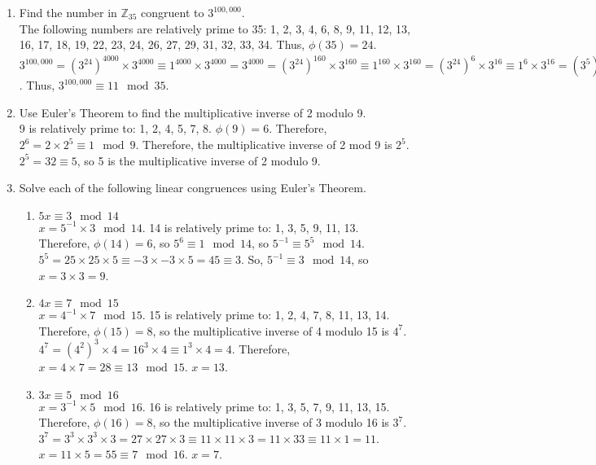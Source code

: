 \documentclass{article}
\begin{document}
\begin{enumerate}
    \item Find the number in $\mathbb{Z}_{35}$ congruent to $3^{100,000}$.\\
    The following numbers are relatively prime to 35: 1, 2, 3, 4, 6, 8, 9, 11, 12, 13, 16, 17, 18, 19, 22, 23, 24, 26, 27, 29, 31, 32, 33, 34. Thus, $\phi(35) = 24$. $3^{100,000} = (3^{24})^{4000} \times 3^{4000} \equiv 1^{4000} \times 3^{4000} = 3^{4000} = (3^{24})^{160} \times 3^{160} \equiv 1^{160} \times 3^{160} = (3^{24})^{6} \times 3^{16} \equiv 1^{6} \times 3^{16} = (3^{5})^{3} \times 3 = 243^{3} \times 3 \equiv (-2)^{3} \times 3 = -24 \equiv 11 \mod 35$. Thus, $3^{100,000} \equiv 11 \mod{35}$.
    \item Use Euler’s Theorem to find the multiplicative inverse of 2 modulo 9.\\
    9 is relatively prime to: 1, 2, 4, 5, 7, 8. $\phi(9) = 6$. Therefore, $2^{6} = 2 \times 2^{5} \equiv 1 \mod{9}$. Therefore, the multiplicative inverse of 2 mod 9 is $2^{5}$. $2^{5} = 32 \equiv 5$, so 5 is the multiplicative inverse of 2 modulo 9.
    \item Solve each of the following linear congruences using Euler’s Theorem.
    \begin{enumerate}
        \item $5x \equiv 3 \mod{14}$\\
        $x = 5^{-1} \times 3 \mod{14}$. 14 is relatively prime to: 1, 3, 5, 9, 11, 13. Therefore, $\phi(14) = 6$, so $5^{6} \equiv 1 \mod{14}$, so $5^{-1} \equiv 5^{5} \mod{14}$. $5^{5} = 25 \times 25 \times 5 \equiv -3 \times -3 \times 5 = 45 \equiv 3$. So, $5^{-1} \equiv 3 \mod{14}$, so $x = 3 \times 3 = 9$.
        \item $4x \equiv 7 \mod{15}$\\
        $x = 4^{-1} \times 7 \mod{15}$. 15 is relatively prime to: 1, 2, 4, 7, 8, 11, 13, 14. Therefore, $\phi(15) = 8$, so the multiplicative inverse of 4 modulo 15 is $4^{7}$. $4^{7} = (4^{2})^{3} \times 4 = 16^{3} \times 4 \equiv 1^{3} \times 4 = 4$. Therefore, $x = 4 \times 7 = 28 \equiv 13 \mod{15}$. $x = 13$.
        \item $3x \equiv 5 \mod{16}$\\
        $x = 3^{-1} \times 5 \mod{16}$. 16 is relatively prime to: 1, 3, 5, 7, 9, 11, 13, 15. Therefore, $\phi(16) = 8$, so the multiplicative inverse of 3 modulo 16 is $3^{7}$. $3^{7} = 3^{3} \times 3^{3} \times 3 = 27 \times 27 \times 3 \equiv 11 \times 11 \times 3 = 11 \times 33 \equiv 11 \times 1 = 11$. $x = 11 \times 5 = 55 \equiv 7 \mod{16}$. $x = 7$.

\end{enumerate}
\end{enumerate}
\end{document}
